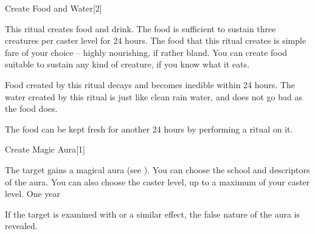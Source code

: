 \begin{spellsection}{Create Food and Water}[2]
    \begin{spellheader}
    \end{spellheader}
    \begin{spellcontent}
        \begin{spelltargetinginfo}
            \spellrng{\rngclose}
        \end{spelltargetinginfo}
        \begin{spelleffects}

            \spellline
            \spelleffect This ritual creates food and drink. The food is sufficient to sustain three creatures per caster level for 24 hours. The food that this ritual creates is simple fare of your choice -- highly nourishing, if rather bland. You can create food suitable to sustain any kind of creature, if you know what it eats.

            Food created by this ritual decays and becomes inedible within 24 hours. The water created by this ritual is just like clean rain water, and does not go bad as the food does.
        \end{spelleffects}
    \end{spellcontent}
    \begin{spellfooter}
        \spellnotes The food can be kept fresh for another 24 hours by performing a  ritual on it.
    \end{spellfooter}
\end{spellsection}

\begin{spellsection}{Create Magic Aura}[1]
    \begin{spellheader}
    \end{spellheader}
    \begin{spellcontent}
        \begin{spelltargetinginfo}
        \end{spelltargetinginfo}
        \begin{spelleffects}

            \spelleffect The target gains a magical aura (see ). You can choose the school and descriptors of the aura. You can also choose the caster level, up to a maximum of your caster level.
            \spelldur One year \dismissable
        \end{spelleffects}
    \end{spellcontent}
    \begin{spellfooter}
        \spellnotes If the target is examined with  or a similar effect, the false nature of the aura is revealed.
    \end{spellfooter}
\end{spellsection}

